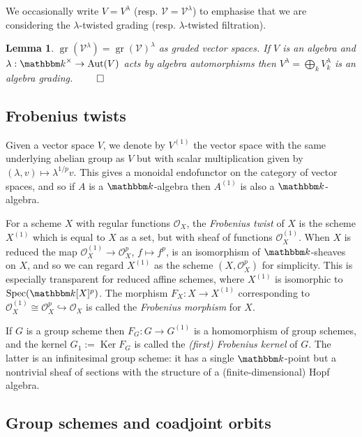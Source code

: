 \documentclass[twoside,12pt,reqno]{amsart}
\newtheorem{Lemma}[Theorem]{Lemma}
\theoremstyle{remark}
\numberwithin{equation}{section}
\def\k{{\mathbbm k}}
\def\Ker{\operatorname{Ker}}
\def\gr{\operatorname{gr}}
\def\Spec{\operatorname{Spec}}
\def\Aut{\operatorname{Aut}}
\def\Oc{\mathcal{O}}
\def\V{\mathcal{V}}
\begin{document}
We occasionally write $V = V^\lambda$ (resp. $\V = \V^\lambda$) to emphasise that we are considering the $\lambda$-twisted grading (resp. $\lambda$-twisted filtration).

\begin{Lemma}
\label{L:twistingfiltrations}
$\gr(\V^\lambda) = \gr(\V)^\lambda$ as graded vector spaces. If $V$ is an algebra and $\lambda: \k^\times \to \Aut(V)$ acts by algebra automorphisms then $V^\lambda = \bigoplus_k V^\lambda_k$ is an algebra grading. $\hfill \qed$ 
\end{Lemma}



\subsection{Frobenius twists}

Given a vector space $V$, we denote by $V^{(1)}$ the vector space with the same underlying abelian group as $V$ but with scalar multiplication given by $(\lambda,v)\mapsto \lambda^{1/p} v$. This gives a monoidal endofunctor on the category of vector spaces, and so if $A$ is a $\k$-algebra then $A^{(1)}$ is also a $\k$-algebra.

For a scheme $X$ with regular functions $\Oc_X$, the {\em Frobenius twist} of $X$ is the scheme $X^{(1)}$ which is equal to $X$ as a set, but with sheaf of functions $\Oc_X^{(1)}$.
When $X$ is reduced the map $\Oc_X^{(1)}\to \Oc_X^p$, $f\mapsto f^p$, is an isomorphism of $\k$-sheaves on $X$, and so we can regard $X^{(1)}$ as the scheme $(X, \Oc_X^p)$ for simplicity. 
This is especially transparent for reduced affine schemes, where $X^{(1)}$ is isomorphic to $\Spec (\k[X]^p)$. 
The morphism $F_X: X \to X^{(1)}$ corresponding to $\Oc_X^{(1)}\cong\Oc_X^p\hookrightarrow\Oc_X$ is called the {\em Frobenius morphism} for $X$. 



If $G$ is a group scheme then $F_G : G \to G^{(1)}$ is a homomorphism of group schemes, and the kernel $G_1 := \Ker F_G$ is called the {\it (first) Frobenius kernel} of $G$. The latter is an infinitesimal group scheme: it has a single $\k$-point but a nontrivial sheaf of sections with the structure of a (finite-dimensional) Hopf algebra.


\subsection{Group schemes and coadjoint orbits}
\label{ss:groupschemesandorbits}
\end{document}

